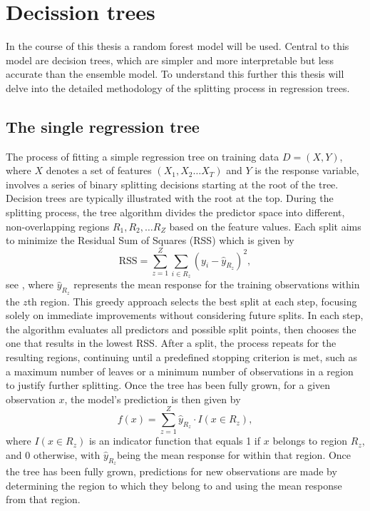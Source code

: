 \documentclass[12pt]{article}
\begin{document}
\section{Decission trees}
In the course of this thesis a random forest model will be used. Central to this model are decision trees, which are simpler and more interpretable but less accurate than the ensemble model. To understand this further this thesis will delve into the detailed methodology of the splitting process in regression trees.


\subsection{The single regression tree}
The process of fitting a simple regression tree on training data $D=(X,Y)$, where $X$ denotes a set of features $(X_1, X_2 \ldots X_T)$ and $Y$ is the response variable, involves a series of binary splitting decisions starting at the root of the tree.  Decision trees are typically illustrated with the root at the top.
 During the splitting process, the tree algorithm divides the predictor space into different, non-overlapping regions $R_1, R_2, \ldots R_Z$ based on the feature values. Each split aims to minimize the Residual Sum of Squares (RSS) which is given by
 \begin{equation}
\text{RSS} = \sum_{z=1}^{Z} \sum_{i \in R_z} (y_i - \hat{y}_{R_z})^2,
 \end{equation}
see \citep[Section~8.1.1]{statlearning},
where \(\hat{y}_{R_z}\) represents the mean response for the training observations within the $z$th region. 
This greedy approach selects the best split at each step, focusing solely on immediate improvements without considering future splits. In each step, the algorithm evaluates all predictors and possible split points, then chooses the one that results in the lowest RSS. After a split, the process repeats for the resulting regions, continuing until a predefined stopping criterion is met, such as a maximum number of leaves or a minimum number of observations in a region to justify further splitting.
Once the tree has been fully grown, for a given observation \(x\), the model's prediction is then given by
 \begin{equation}
f(x) = \sum_{z=1}^{Z} \hat{y}_{R_z} \cdot I(x \in R_z),
 \end{equation}
where \(I(x \in R_z)\) is an indicator function that equals 1 if \(x\) belongs to region \(R_z\), and 0 otherwise, with \(\hat{y}_{R_z}\)being the mean response for  within that region. Once the tree has been fully grown, predictions for new observations are made by determining the region to which they belong to and using the mean response from that region.
\end{document}
